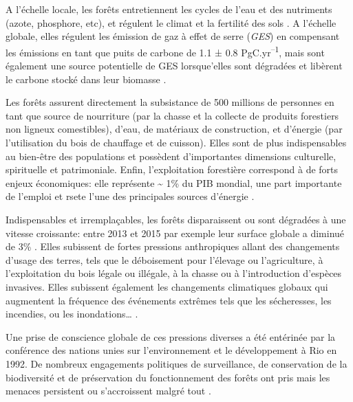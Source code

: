\documentclass[
  11pt,
  french,
  A4paper,
  extrafontsizes,onecolumn,openright
  ]{memoir}
\begin{document}
A l'échelle locale, les forêts entretiennent les cycles de l'eau et des
nutriments (azote, phosphore, etc), et régulent le climat et la
fertilité des sols \autocites{Malhi2008}{Isbell2017}. A l'échelle
globale, elles régulent les émission de gaz à effet de serre
(\emph{GES}) en compensant les émissions en tant que puits de carbone de
1.1 ± 0.8 PgC.yr\textsuperscript{--1}, mais sont également une source
potentielle de GES lorsque'elles sont dégradées et libèrent le carbone
stocké dans leur biomasse \autocites{Pan2011}{Roy2017}.

Les forêts assurent directement la subsistance de 500 millions de
personnes en tant que source de nourriture (par la chasse et la collecte
de produits forestiers non ligneux comestibles), d'eau, de matériaux de
construction, et d'énergie (par l'utilisation du bois de chauffage et de
cuisson). Elles sont de plus indispensables au bien-être des populations
et possèdent d'importantes dimensions culturelle, spirituelle et
patrimoniale. Enfin, l'exploitation forestière correspond à de forts
enjeux économiques: elle représente \textasciitilde{} 1\% du PIB
mondial, une part importante de l'emploi et rsete l'une des principales
sources d'énergie \autocites{CBDdiversity2011}{FAO2014}.

Indispensables et irremplaçables, les forêts disparaissent ou sont
dégradées à une vitesse croissante: entre 2013 et 2015 par exemple leur
surface globale a diminué de 3\% \autocite{FAO2009}. Elles subissent de
fortes pressions anthropiques allant des changements d'usage des terres,
tels que le déboisement pour l'élevage ou l'agriculture, à
l'exploitation du bois légale ou illégale, à la chasse ou à
l'introduction d'espèces invasives. Elles subissent également les
changements climatiques globaux qui augmentent la fréquence des
événements extrêmes tels que les sécheresses, les incendies, ou les
inondations\ldots{} \autocite{Pachauri2014}.

Une prise de conscience globale de ces pressions diverses a été
entérinée par la conférence des nations unies sur l'environnement et le
développement à Rio en 1992. De nombreux engagements politiques de
surveillance, de conservation de la biodiversité et de préservation du
fonctionnement des forêts ont pris mais les menaces persistent ou
s'accroissent malgré tout
\autocites{Summit1992}{Schlaepfer2000}{Dirzo2003a}{Morales-Hidalgo2015}.
\end{document}
